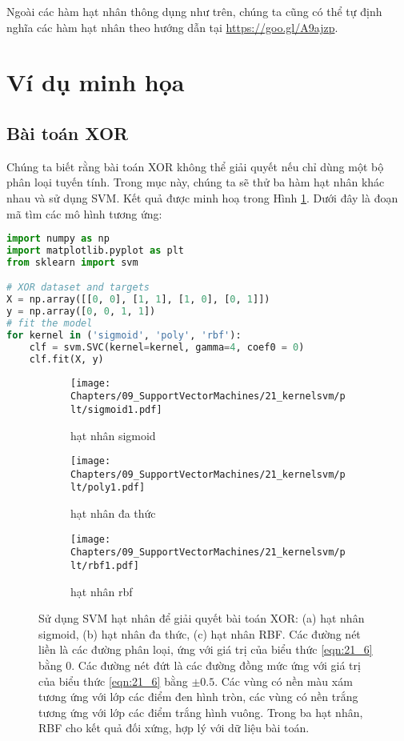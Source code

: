 Ngoài các hàm hạt nhân thông dụng như trên, chúng ta cũng có thể tự định nghĩa các
hàm hạt nhân theo hướng dẫn tại \url{https://goo.gl/A9ajzp}.

\section{Ví dụ minh họa}


\subsection{Bài toán XOR}
Chúng ta biết rằng bài toán XOR không
thể giải quyết nếu chỉ dùng một bộ phân loại tuyến tính. Trong mục này, chúng ta sẽ thử ba hàm hạt nhân khác nhau và sử dụng SVM. Kết quả được minh hoạ trong Hình \ref{fig:21_2}. Dưới đây là đoạn mã tìm các mô hình tương ứng:

\begin{lstlisting}[language=Python]
import numpy as np
import matplotlib.pyplot as plt
from sklearn import svm

# XOR dataset and targets
X = np.array([[0, 0], [1, 1], [1, 0], [0, 1]])
y = np.array([0, 0, 1, 1])
# fit the model
for kernel in ('sigmoid', 'poly', 'rbf'):
    clf = svm.SVC(kernel=kernel, gamma=4, coef0 = 0)
    clf.fit(X, y)
\end{lstlisting}
%

\begin{figure}[t]
\begin{subfigure}{0.325\textwidth}
\texttt{[image: Chapters/09\_SupportVectorMachines/21\_kernelsvm/plt/sigmoid1.pdf]}
\caption{hạt nhân sigmoid}
\end{subfigure}
\begin{subfigure}{0.325\textwidth}
\texttt{[image: Chapters/09\_SupportVectorMachines/21\_kernelsvm/plt/poly1.pdf]}
\caption{hạt nhân đa thức}
\end{subfigure}
\begin{subfigure}{0.325\textwidth}
\texttt{[image: Chapters/09\_SupportVectorMachines/21\_kernelsvm/plt/rbf1.pdf]}
\caption{hạt nhân rbf}
\end{subfigure}

\caption{
Sử dụng SVM hạt nhân để giải quyết bài toán XOR: (a) hạt nhân sigmoid, (b)
hạt nhân đa thức, (c) hạt nhân RBF. Các đường nét liền là các đường phân loại,
ứng với giá trị của biểu thức \eqref{eqn:21_6} bằng 0. Các đường nét đứt là
các đường đồng mức ứng với giá trị của biểu thức \eqref{eqn:21_6} bằng $\pm
0.5$. Các vùng có nền màu xám tương ứng với lớp các điểm đen hình tròn, các
vùng có nền trắng tương ứng với lớp các điểm trắng hình vuông. Trong ba
hạt nhân, RBF cho kết quả đối xứng, hợp lý
với dữ liệu bài toán. }
\label{fig:21_2}
\end{figure}

